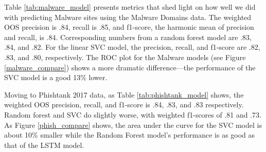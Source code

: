 \documentclass[12pt, letterpaper]{article}
\begin{document}
Table \ref{tab:malware_model} presents metrics that shed light on how well we did with predicting Malware sites using the Malware Domains data. The weighted OOS precision is .84, recall is .85, and f1-score, the harmonic mean of precision and recall, is .84. Corresponding numbers from a random forest model are .83, .84, and .82. For the linear SVC model, the precision, recall, and f1-score are .82, .83, and .80, respectively. The ROC plot for the Malware models (see Figure \ref{malware_compare}) shows a more dramatic difference---the performance of the SVC model is a good 13\% lower.

Moving to Phishtank 2017 data, as Table \ref{tab:phishtank_model} shows, the weighted OOS precision, recall, and f1-score is .84, .83, and .83 respectively. Random forest and SVC do slightly worse, with weighted f1-scores of .81 and .73. As Figure \ref{phish_compare} shows, the area under the curve for the SVC model is about 10\% smaller while the Random Forest model's performance is as good as that of the LSTM model.
\end{document}
